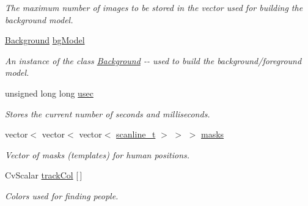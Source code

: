 \begin{DoxyCompactItemize}
\begin{DoxyCompactList}\small\item\em The maximum number of images to be stored in the vector used for building the background model. \item\end{DoxyCompactList}\item 
\hypertarget{classfindPersonImage_a5d2a001b4866dcbf48866109c6541707}{
\hyperlink{classBackground}{Background} \hyperlink{classfindPersonImage_a5d2a001b4866dcbf48866109c6541707}{bgModel}}
\label{classfindPersonImage_a5d2a001b4866dcbf48866109c6541707}

\begin{DoxyCompactList}\small\item\em An instance of the class {\ttfamily \hyperlink{classBackground}{Background}} -\/-\/ used to build the background/foreground model. \item\end{DoxyCompactList}\item 
\hypertarget{classfindPersonImage_ab8a3060a5d457e6907f73cbbc25ccae0}{
unsigned long long \hyperlink{classfindPersonImage_ab8a3060a5d457e6907f73cbbc25ccae0}{usec}}
\label{classfindPersonImage_ab8a3060a5d457e6907f73cbbc25ccae0}

\begin{DoxyCompactList}\small\item\em Stores the current number of seconds and milliseconds. \item\end{DoxyCompactList}\item 
\hypertarget{classfindPersonImage_adad90fa030af56592ad194a41341ffcd}{
vector$<$ vector$<$ vector$<$ \hyperlink{structscanline__t}{scanline\_\-t} $>$ $>$ $>$ \hyperlink{classfindPersonImage_adad90fa030af56592ad194a41341ffcd}{masks}}
\label{classfindPersonImage_adad90fa030af56592ad194a41341ffcd}

\begin{DoxyCompactList}\small\item\em Vector of masks (templates) for human positions. \item\end{DoxyCompactList}\item 
\hypertarget{classfindPersonImage_ac1b0baa7d4a9b358f4ea4f2b643f174b}{
CvScalar \hyperlink{classfindPersonImage_ac1b0baa7d4a9b358f4ea4f2b643f174b}{trackCol} \mbox{[}$\,$\mbox{]}}
\label{classfindPersonImage_ac1b0baa7d4a9b358f4ea4f2b643f174b}

\begin{DoxyCompactList}\small\item\em Colors used for finding people. \item\end{DoxyCompactList}\end{DoxyCompactItemize}


